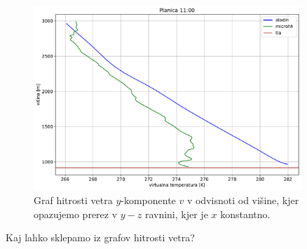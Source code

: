 \documentclass[mat2, tisk]{fmfdelo}
\begin{document}
\newpage

\begin{figure}[h!]
  \centering
  \includegraphics[width=0.9\textwidth]{rezultati/tv_planica_long_5.pdf}
  \caption{Graf hitrosti vetra $y$-komponente $v$ v odvisnoti od višine, kjer opazujemo 
  prerez v $y-z$ ravnini, kjer je $x$ konstantno. \label{fig:planica_vy}}
\end{figure}


Kaj lahko sklepamo iz grafov hitrosti vetra?
\end{document}
